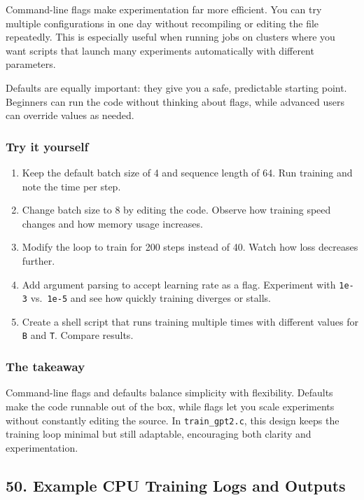 \documentclass[
  letterpaper,
  DIV=11,
  numbers=noendperiod]{scrreprt}
\providecommand{\tightlist}{%
  \setlength{\itemsep}{0pt}\setlength{\parskip}{0pt}}
\begin{document}
Command-line flags make experimentation far more efficient. You can try
multiple configurations in one day without recompiling or editing the
file repeatedly. This is especially useful when running jobs on clusters
where you want scripts that launch many experiments automatically with
different parameters.

Defaults are equally important: they give you a safe, predictable
starting point. Beginners can run the code without thinking about flags,
while advanced users can override values as needed.

\subsubsection{Try it yourself}\label{try-it-yourself-37}

\begin{enumerate}
\def\labelenumi{\arabic{enumi}.}
\tightlist
\item
  Keep the default batch size of 4 and sequence length of 64. Run
  training and note the time per step.
\item
  Change batch size to 8 by editing the code. Observe how training speed
  changes and how memory usage increases.
\item
  Modify the loop to train for 200 steps instead of 40. Watch how loss
  decreases further.
\item
  Add argument parsing to accept learning rate as a flag. Experiment
  with \texttt{1e-3} vs.~\texttt{1e-5} and see how quickly training
  diverges or stalls.
\item
  Create a shell script that runs training multiple times with different
  values for \texttt{B} and \texttt{T}. Compare results.
\end{enumerate}

\subsubsection{The takeaway}\label{the-takeaway-38}

Command-line flags and defaults balance simplicity with flexibility.
Defaults make the code runnable out of the box, while flags let you
scale experiments without constantly editing the source. In
\texttt{train\_gpt2.c}, this design keeps the training loop minimal but
still adaptable, encouraging both clarity and experimentation.

\subsection{50. Example CPU Training Logs and
Outputs}\label{example-cpu-training-logs-and-outputs}
\end{document}
